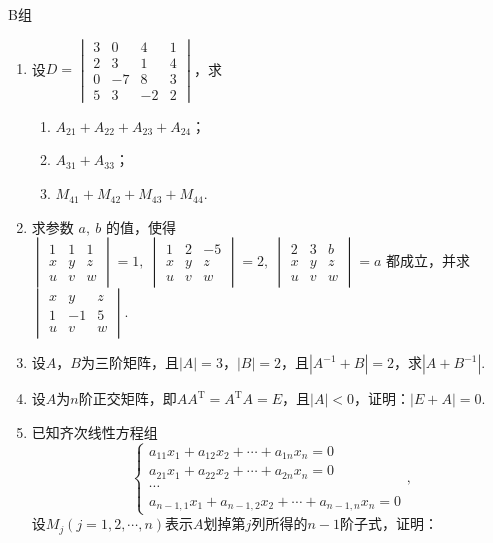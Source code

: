 \centerline{\heiti B组}
\begin{enumerate}
    \item 设$D=\begin{vmatrix}
		3 & 0 & 4 & 1 \\ 2 & 3 & 1 & 4 \\ 0 & -7 & 8 & 3 \\ 5 & 3 & -2 & 2
	\end{vmatrix}$，求
    \begin{enumerate}[label=(\arabic*)]
        \item $A_{21}+A_{22}+A_{23}+A_{24}$；
        \item $A_{31}+A_{33}$；
        \item $M_{41}+M_{42}+M_{43}+M_{44}$.
    \end{enumerate}
	\item 求参数 $a,\ b$  的值，使得 $\begin{vmatrix}1 & 1 & 1 \\ x & y & z \\u & v & w\end{vmatrix}=1,\ \begin{vmatrix}1 & 2 & -5 \\ x & y & z \\u & v & w\end{vmatrix}=2,\ \begin{vmatrix}2 & 3 & b \\ x & y & z \\u & v & w\end{vmatrix}=a$ 都成立，并求$\begin{vmatrix}x & y & z \\ 1 & -1 & 5 \\u & v & w\end{vmatrix}$.
	\item 设$A$，$B$为三阶矩阵，且$|A|=3$，$|B|=2$，且$|A^{-1}+B|=2$，求$|A+B^{-1}|$.
	\item 设$A$为$n$阶正交矩阵，即$AA^\mathrm{T}=A^\mathrm{T}A=E$，且$|A|<0$，证明：$|E+A|=0$.
	\item 已知齐次线性方程组
    \[\begin{cases}
		a_{11}x_1+a_{12}x_2+\cdots+a_{1n}x_n=0 \\
		a_{21}x_1+a_{22}x_2+\cdots+a_{2n}x_n=0 \\
		\cdots \\
		a_{n-1,1}x_1+a_{n-1,2}x_2+\cdots+a_{n-1,n}x_n=0
	\end{cases},\]
    设$M_j(j=1,2,\cdots,n)$表示$A$划掉第$j$列所得的$n-1$阶子式，证明：
    \begin{enumerate}[label=(\arabic*)]

\end{enumerate}
\end{enumerate}
